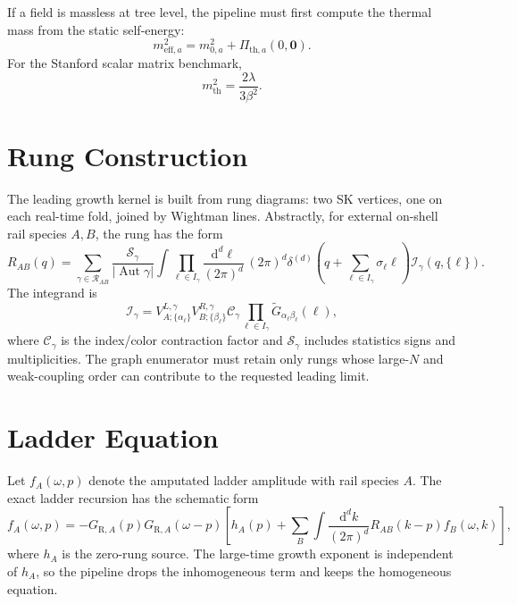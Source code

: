 \documentclass[11pt]{article}
\newcommand{\dd}{\mathrm{d}}
\newcommand{\eff}{\mathrm{eff}}
\newcommand{\thm}{\mathrm{th}}
\newcommand{\R}{\mathrm{R}}
\begin{document}
If a field is massless at tree level, the pipeline must first compute the
thermal mass from the static self-energy:
\begin{equation}
  m_{\eff,a}^2
  =
  m_{0,a}^2 + \Pi_{\thm,a}(0,\mathbf 0).
  \label{eq:thermal-mass-general}
\end{equation}
For the Stanford scalar matrix benchmark,
\begin{equation}
  m_{\thm}^2 = \frac{2\lambda}{3\beta^2}.
  \label{eq:stanford-thermal-mass}
\end{equation}

\section{Rung Construction}

The leading growth kernel is built from rung diagrams: two SK vertices, one on
each real-time fold, joined by Wightman lines. Abstractly, for external
on-shell rail species \(A,B\), the rung has the form
\begin{equation}
  R_{AB}(q)
  =
  \sum_{\gamma\in\mathcal R_{AB}}
  \frac{\mathcal S_\gamma}{|\operatorname{Aut}\gamma|}
  \int
  \prod_{\ell\in I_\gamma}
  \frac{\dd^d\ell}{(2\pi)^d}
  \,
  (2\pi)^d
  \delta^{(d)}
  \left(q+\sum_{\ell\in I_\gamma}\sigma_\ell \ell\right)
  \mathcal I_\gamma(q,\{\ell\}).
  \label{eq:general-rung}
\end{equation}
The integrand is
\begin{equation}
  \mathcal I_\gamma
  =
  V^{L,\gamma}_{A;\{\alpha_\ell\}}
  V^{R,\gamma}_{B;\{\beta_\ell\}}
  \mathcal C_\gamma
  \prod_{\ell\in I_\gamma}
  \widetilde G_{\alpha_\ell\beta_\ell}(\ell),
  \label{eq:rung-integrand}
\end{equation}
where \(\mathcal C_\gamma\) is the index/color contraction factor and
\(\mathcal S_\gamma\) includes statistics signs and multiplicities. The graph
enumerator must retain only rungs whose large-\(N\) and weak-coupling order can
contribute to the requested leading limit.

\section{Ladder Equation}

Let \(f_A(\omega,p)\) denote the amputated ladder amplitude with rail species
\(A\). The exact ladder recursion has the schematic form
\begin{equation}
  f_A(\omega,p)
  =
  -G_{\R,A}(p)G_{\R,A}(\omega-p)
  \left[
    h_A(p)
    +
    \sum_B
    \int\frac{\dd^d k}{(2\pi)^d}
    R_{AB}(k-p)f_B(\omega,k)
  \right],
  \label{eq:ladder-recursion}
\end{equation}
where \(h_A\) is the zero-rung source. The large-time growth exponent is
independent of \(h_A\), so the pipeline drops the inhomogeneous term and keeps
the homogeneous equation.
\end{document}
